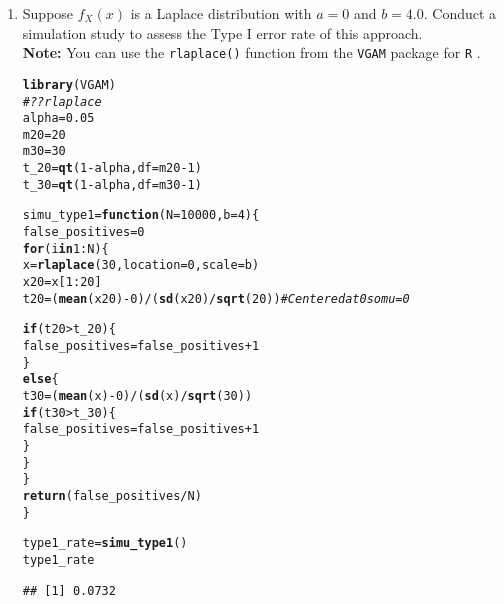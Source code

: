 \documentclass{article}\usepackage[]{graphicx}\usepackage[]{xcolor}
\makeatletter
\newcommand{\hlnum}[1]{\textcolor[rgb]{0.686,0.059,0.569}{#1}}%
\newcommand{\hlcom}[1]{\textcolor[rgb]{0.678,0.584,0.686}{\textit{#1}}}%
\newcommand{\hlopt}[1]{\textcolor[rgb]{0,0,0}{#1}}%
\newcommand{\hldef}[1]{\textcolor[rgb]{0.345,0.345,0.345}{#1}}%
\newcommand{\hlkwa}[1]{\textcolor[rgb]{0.161,0.373,0.58}{\textbf{#1}}}%
\newcommand{\hlkwb}[1]{\textcolor[rgb]{0.69,0.353,0.396}{#1}}%
\newcommand{\hlkwc}[1]{\textcolor[rgb]{0.333,0.667,0.333}{#1}}%
\newcommand{\hlkwd}[1]{\textcolor[rgb]{0.737,0.353,0.396}{\textbf{#1}}}%
\newenvironment{kframe}{%
 \def\at@end@of@kframe{}%
 \ifinner\ifhmode%
  \def\at@end@of@kframe{\end{minipage}}%
  \begin{minipage}{\columnwidth}%
 \fi\fi%
 \def\FrameCommand##1{\hskip\@totalleftmargin \hskip-\fboxsep
 \colorbox{shadecolor}{##1}\hskip-\fboxsep
     \hskip-\linewidth \hskip-\@totalleftmargin \hskip\columnwidth}%
 \MakeFramed {\advance\hsize-\width
   \@totalleftmargin\z@ \linewidth\hsize
   \@setminipage}}%
 {\par\unskip\endMakeFramed%
 \at@end@of@kframe}
\newenvironment{knitrout}{}{} %
\makeatother
\begin{document}
\begin{enumerate}
\begin{enumerate}
  \item Suppose $f_X(x)$ is a Laplace distribution with $a=0$ and $b=4.0$.
  Conduct a simulation study to assess the Type I error rate of this approach.\\
  \textbf{Note:} You can use the \texttt{rlaplace()} function from the \texttt{VGAM}
  package for \texttt{R} \citep{VGAM}.
\begin{knitrout}
\color{fgcolor}\begin{kframe}
\begin{alltt}
\hlkwd{library}\hldef{(VGAM)}
\hlcom{#??rlaplace}
\hldef{alpha} \hlkwb{=} \hlnum{0.05}
\hldef{m20} \hlkwb{=} \hlnum{20}
\hldef{m30} \hlkwb{=} \hlnum{30}
\hldef{t_20} \hlkwb{=} \hlkwd{qt}\hldef{(}\hlnum{1}\hlopt{-}\hldef{alpha,} \hlkwc{df} \hldef{= m20}\hlopt{-}\hlnum{1}\hldef{)}
\hldef{t_30} \hlkwb{=} \hlkwd{qt}\hldef{(}\hlnum{1}\hlopt{-}\hldef{alpha,} \hlkwc{df} \hldef{= m30}\hlopt{-}\hlnum{1}\hldef{)}

\hldef{simu_type1} \hlkwb{=} \hlkwa{function}\hldef{(}\hlkwc{N} \hldef{=} \hlnum{10000}\hldef{,} \hlkwc{b} \hldef{=} \hlnum{4}\hldef{)\{}
  \hldef{false_positives} \hlkwb{=} \hlnum{0}
  \hlkwa{for} \hldef{(i} \hlkwa{in} \hlnum{1}\hlopt{:}\hldef{N)\{}
    \hldef{x} \hlkwb{=} \hlkwd{rlaplace}\hldef{(}\hlnum{30}\hldef{,} \hlkwc{location} \hldef{=} \hlnum{0}\hldef{,} \hlkwc{scale} \hldef{= b)}
    \hldef{x20} \hlkwb{=} \hldef{x[}\hlnum{1}\hlopt{:}\hlnum{20}\hldef{]}
    \hldef{t20} \hlkwb{=} \hldef{(}\hlkwd{mean}\hldef{(x20)} \hlopt{-} \hlnum{0}\hldef{)} \hlopt{/} \hldef{(}\hlkwd{sd}\hldef{(x20)}\hlopt{/}\hlkwd{sqrt}\hldef{(}\hlnum{20}\hldef{))} \hlcom{# Centered at 0 so mu = 0}

    \hlkwa{if} \hldef{(t20} \hlopt{>} \hldef{t_20)\{}
      \hldef{false_positives} \hlkwb{=} \hldef{false_positives} \hlopt{+} \hlnum{1}
    \hldef{\}}
    \hlkwa{else} \hldef{\{}
      \hldef{t30} \hlkwb{=} \hldef{(}\hlkwd{mean}\hldef{(x)} \hlopt{-} \hlnum{0}\hldef{)} \hlopt{/} \hldef{(}\hlkwd{sd}\hldef{(x)}\hlopt{/}\hlkwd{sqrt}\hldef{(}\hlnum{30}\hldef{))}
      \hlkwa{if} \hldef{(t30} \hlopt{>} \hldef{t_30)\{}
        \hldef{false_positives} \hlkwb{=} \hldef{false_positives} \hlopt{+} \hlnum{1}
      \hldef{\}}
    \hldef{\}}
  \hldef{\}}
  \hlkwd{return}\hldef{(false_positives} \hlopt{/} \hldef{N)}
\hldef{\}}

\hldef{type1_rate} \hlkwb{=} \hlkwd{simu_type1}\hldef{()}
\hldef{type1_rate}
\end{alltt}
\begin{verbatim}
## [1] 0.0732
\end{verbatim}
\end{kframe}
\end{knitrout}
  

\end{enumerate}
\end{enumerate}
\end{document}
